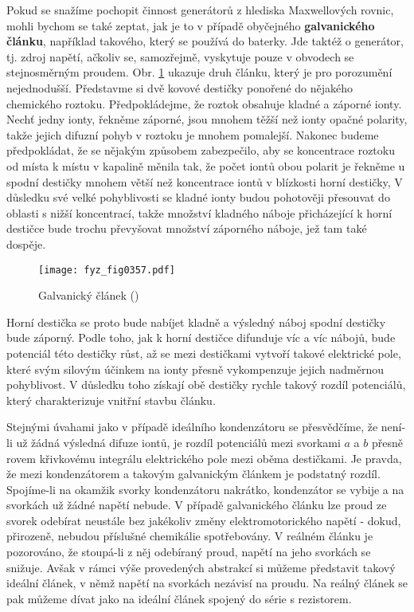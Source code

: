   Pokud se snažíme pochopit činnost generátorů z hlediska Maxwellových rovnic, mohli bychom se také 
  zeptat, jak je to v případě obyčejného \textbf{galvanického článku}, například takového, který se 
  používá do baterky. Jde taktéž o generátor, tj. zdroj napětí, ačkoliv se, samozřejmě, vyskytuje 
  pouze v obvodech se stejnosměrným proudem. Obr. \ref{fyz:fig0357} ukazuje druh článku, který je 
  pro porozumění nejednodušší. Představme si dvě kovové destičky ponořené do nějakého chemického 
  roztoku. Předpokládejme, že roztok obsahuje kladné a záporné ionty. Nechť jedny ionty, řekněme 
  záporné, jsou mnohem těžší než ionty opačné polarity, takže jejich difuzní pohyb v roztoku je 
  mnohem pomalejší. Nakonec budeme předpokládat, že se nějakým způsobem zabezpečilo, aby se 
  koncentrace roztoku od místa k místu v kapalině měnila tak, že počet iontů obou polarit je 
  řekněme u spodní destičky mnohem větší než koncentrace iontů v blízkosti horní destičky, V 
  důsledku své velké pohyblivosti se kladné ionty budou pohotověji přesouvat do oblasti s nižší 
  koncentrací, takže množství kladného náboje přicházející k horní destičce bude trochu převyšovat 
  množství záporného náboje, jež tam také dospěje.

  \begin{figure}[ht!] %
    \centering
    \texttt{[image: fyz\_fig0357.pdf]}
    \caption{Galvanický článek
             (\cite[s.~398]{Feynman02})}
    \label{fyz:fig0357}
  \end{figure}
  
  Horní destička se proto bude nabíjet kladně a výsledný náboj spodní destičky bude záporný. Podle 
  toho, jak k horní destičce difunduje víc a víc nábojů, bude potenciál této destičky růst, až se 
  mezi destičkami vytvoří takové elektrické pole, které svým silovým účinkem na ionty přesně 
  vykompenzuje jejich nadměrnou pohyblivost. V důsledku toho získají obě destičky rychle takový 
  rozdíl potenciálů, který charakterizuje vnitřní stavbu článku.
  
  Stejnými úvahami jako v případě ideálního kondenzátoru se přesvědčíme, že není-li už žádná 
  výsledná difuze iontů, je rozdíl potenciálů mezi svorkami \(a\) a \(b\) přesně rovem křivkovému 
  integrálu elektrického pole mezi oběma destičkami. Je pravda, že mezi kondenzátorem a takovým 
  galvanickým článkem je podstatný rozdíl. Spojíme-li na okamžik svorky kondenzátoru nakrátko, 
  kondenzátor se vybije a na svorkách už žádné napětí nebude. V případě galvanického článku lze 
  proud ze svorek odebírat neustále bez jakékoliv změny elektromotorického napětí - dokud, 
  přirozeně, nebudou příslušné chemikálie spotřebovány. V reálném článku je pozorováno, že 
  stoupá-li z něj odebíraný proud, napětí na jeho svorkách se snižuje. Avšak v rámci výše 
  provedených abstrakcí si můžeme představit takový ideální článek, v němž napětí na svorkách 
  nezávisí na proudu. Na reálný článek se pak můžeme dívat jako na ideální článek spojený do série 
  s rezistorem.
  

